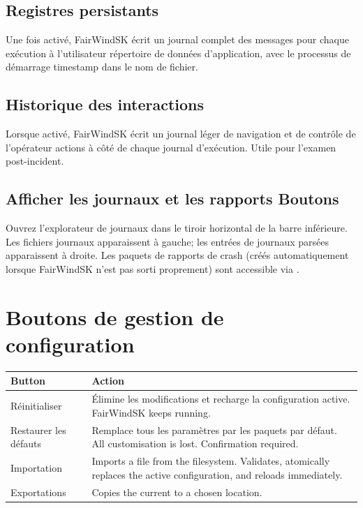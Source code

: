 \subsection{Registres persistants}

Une fois activé, FairWindSK écrit un journal complet des messages pour chaque exécution à l'utilisateur
répertoire de données d'application, avec le processus de démarrage timestamp dans le nom de fichier.

\subsection{Historique des interactions}

Lorsque activé, FairWindSK écrit un journal léger de navigation et de contrôle de l'opérateur
actions à côté de chaque journal d'exécution.
Utile pour l'examen post-incident.

\subsection{Afficher les journaux et les rapports Boutons}

Ouvrez l'explorateur de journaux dans le tiroir horizontal de la barre inférieure.
Les fichiers journaux apparaissent à gauche; les entrées de journaux parsées apparaissent à droite.
Les paquets de rapports de crash (créés automatiquement lorsque FairWindSK n'est pas sorti proprement) sont
accessible via .

\section{Boutons de gestion de configuration}

\begin{longtable}{L{3.2cm}L{10.5cm}}
\toprule
{}
\color{white}\sffamily\bfseries Button &
\color{white}\sffamily\bfseries Action \\
\midrule
Réinitialiser&
Élimine les modifications et recharge la configuration active.
  FairWindSK keeps running. \\
Restaurer les défauts&
Remplace tous les paramètres par les paquets par défaut.
  All customisation is lost. Confirmation required. \\
Importation&
  Imports a  file from the filesystem.
  Validates, atomically replaces the active configuration, and reloads immediately. \\
Exportations&
  Copies the current  to a chosen location. \\
\bottomrule
\end{longtable}

